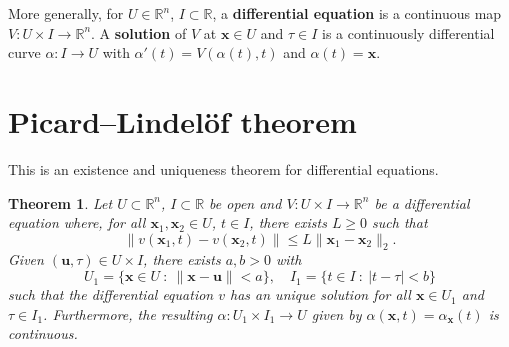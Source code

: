 \documentclass[letter-paper]{tufte-book}
\newtheorem{theorem}{\color{pastel-blue}Theorem}[section]
\begin{document}
More generally, for $U \in \mathbb{R}^n$, $I \subset \mathbb{R}$, a
\textbf{differential equation} is a continuous map $V : U\times I \to
\mathbb{R}^n$. A \textbf{solution} of $V$ at $\boldsymbol{x} \in U$ and $\tau
\in I$ is a continuously differential curve $\alpha : I \to U$ with $\alpha'(t)
= V(\alpha(t), t)$ and $\alpha(t) = \boldsymbol{x}$.


\section{Picard--Lindel\"of theorem}

This is an existence and uniqueness theorem for differential equations.

\begin{theorem}
  Let $U \subset \mathbb{R}^n$, $I \subset \mathbb{R}$ be open and $V : U\times
  I \to \mathbb{R}^n$ be a differential equation where, for all
  $\boldsymbol{x}_1, \boldsymbol{x}_2 \in U$, $t \in I$, there exists $L \geq 0$
  such that
  \begin{equation*}
    \|v(\boldsymbol{x}_1, t) - v(\boldsymbol{x}_2, t)\| \leq L \|\boldsymbol{x}_1 - \boldsymbol{x}_2\|_2.
  \end{equation*}
  Given $(\boldsymbol{u}, \tau) \in U \times I$, there exists $a,b>0$ with
  \begin{equation*}
    U_1 = \{\boldsymbol{x} \in U\ :\ \|\boldsymbol{x} - \boldsymbol{u}\| < a\}, \quad
    I_1 = \{t \in I\ :\ |t - \tau| < b\}
  \end{equation*}
  such that the differential equation $v$ has an unique solution for all
  $\boldsymbol{x} \in U_1$ and $\tau \in I_1$. Furthermore, the resulting
  $\alpha : U_1 \times I_1 \to U$ given by $\alpha(\boldsymbol{x}, t) =
  \alpha_{\boldsymbol{x}}(t)$ is continuous.
\end{theorem}
\end{document}
